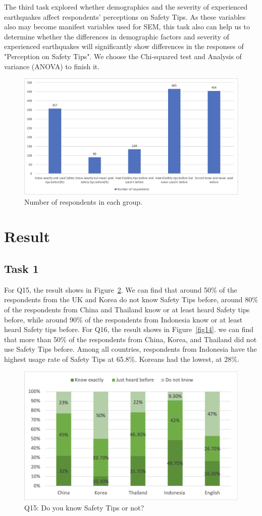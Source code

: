 The third task explored whether demographics and the severity of experienced earthquakes affect respondents' perceptions on Safety Tips. As these variables also may become manifest variables used for SEM, this task also can help us to determine whether the differences in demographic factors and severity of experienced earthquakes will significantly show differences in the responses of "Perception on Safety Tips". We choose the Chi-squared test and Analysis of variance (ANOVA) to finish it.


\begin{figure}[h]
  \includegraphics[width=0.7\linewidth]{Figure/Figure6.jpg}
  \centering
  \caption{Number of respondents in each group. }
  \label{fig6}
\end{figure}




\section{Result}

\subsection{Task 1}
For Q15, the result shows in Figure~\ref{fig13}. We can find that around 50\% of the respondents from the UK and Korea do not know Safety Tips before, around 80\% of the respondents from China and Thailand know or at least heard Safety tips before, while around 90\% of the respondents from Indonesia know or at least heard Safety tips before. For Q16, the result shows in Figure~\ref{fig14}. we can find that more than 50\% of the respondents from China, Korea, and Thailand did not use Safety Tips before. Among all countries, respondents from Indonesia have the highest usage rate of Safety Tips at 65.8\%. Koreans had the lowest, at 28\%. 

\begin{figure}[h]
  \includegraphics[width=0.6\linewidth]{Figure/Figure13.png}
  \centering
  \caption{Q15: Do you know Safety Tips or not?}
  \label{fig13}
\end{figure}

